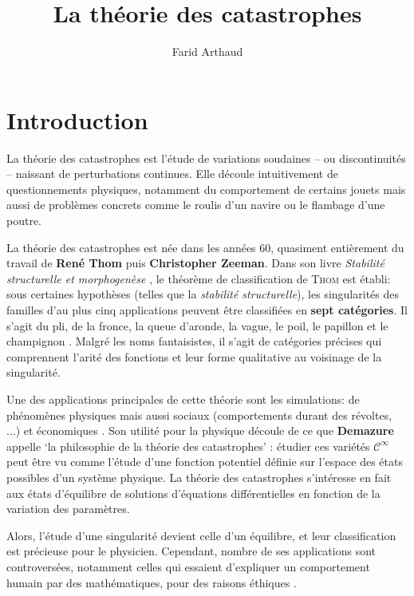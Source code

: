 \documentclass{article}
\begin{document}
\title{La théorie des catastrophes}
\author{Farid Arthaud}

\maketitle
\tableofcontents

\section{Introduction}

La théorie des catastrophes est l'étude de variations soudaines -- ou discontinuités -- naissant de perturbations continues.
Elle découle intuitivement de questionnements physiques, notamment du comportement de certains jouets \cite{bbcvid} mais aussi de problèmes concrets comme le roulis d'un navire \cite{poston} ou le flambage d'une poutre.

La théorie des catastrophes est née dans les années 60, quasiment entièrement du travail de \textbf{René Thom} puis \textbf{Christopher Zeeman}.
Dans son livre \textit{Stabilité structurelle et morphogenèse} \cite{thom}, le théorème de classification de \textsc{Thom} est établi: sous certaines hypothèses (telles que la \textit{stabilité structurelle}), les singularités des familles d'au plus cinq applications peuvent être classifiées en \textbf{sept catégories}.
Il s'agit du pli, de la fronce, la queue d'aronde, la vague, le poil, le papillon et le champignon \cite{wikipedia}.
Malgré les noms fantaisistes, il s'agit de catégories précises qui comprennent l'arité des fonctions et leur forme qualitative au voisinage de la singularité.

Une des applications principales de cette théorie sont les simulations: de phénomènes physiques mais aussi sociaux (comportements durant des révoltes, ...) et économiques \cite{bbcvid} \cite{poston}.
Son utilité pour la physique découle de ce que \textbf{Demazure} appelle `la philosophie de la théorie des catastrophes' \cite{demazure}: étudier ces variétés $\mathcal{C}^\infty$ peut être vu comme l'étude d'une fonction potentiel définie sur l'espace des états possibles d'un système physique.
La théorie des catastrophes s'intéresse en fait aux états d'équilibre de solutions d'équations différentielles en fonction de la variation des paramètres.

Alors, l'étude d'une singularité devient celle d'un équilibre, et leur classification est précieuse pour le physicien.
Cependant, nombre de ses applications sont controversées, notamment celles qui essaient d'expliquer un comportement humain par des mathématiques, pour des raisons éthiques \cite{wikipedia}.
\end{document}
